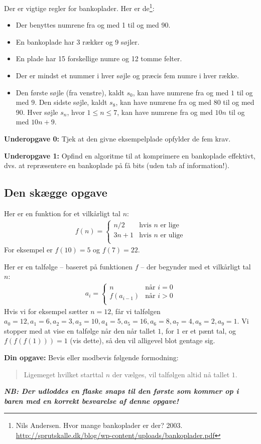 Der er vigtige regler for bankoplader.  Her er de\footnote{Nils Andersen.  Hvor
mange bankoplader er der?  2003.\\
\tiny{\url{http://sprutskalle.dk/blog/wp-content/uploads/bankoplader.pdf}}}:

\begin{itemize}
\item Der benyttes numrene fra og med 1 til og med 90.
\item En bankoplade har 3 rækker og 9 søjler.
\item En plade har 15 forskellige numre og 12 tomme felter.
\item Der er mindst et nummer i hver søjle og præcis fem numre i hver række.
\item Den første søjle (fra venstre), kaldt $s_0$, kan have numrene fra og med
$1$ til og med $9$.  Den sidste søjle, kaldt $s_8$, kan have numrene fra og med
$80$ til og med $90$.  Hver søjle $s_n$, hvor $1 \leq n \leq 7$, kan have
numrene fra og med $10n$ til og med $10n + 9$.
\end{itemize}

\textbf{Underopgave 0:} Tjek at den givne eksempelplade opfylder de fem krav.

\textbf{Underopgave 1:} Opfind en algoritme til at komprimere en bankoplade
effektivt, dvs. at repræsentere en bankoplade på få bits (uden tab af
information!).


\newpage

\subsection{Den skægge opgave}


Her er en funktion for et vilkårligt tal $n$:
\begin{align*}
f(n) = \begin{cases}
n/2 &\text{hvis }n\text{ er lige}\\
3n + 1 &\text{hvis }n\text{ er ulige}\\
\end{cases}
\end{align*}
For eksempel er $f(10) = 5$ og $f(7) = 22$.

Her er en talfølge -- baseret på funktionen $f$ -- der begynder med et
vilkårligt tal $n$:
\begin{align*}
a_i = \begin{cases}
n &\text{når }i = 0\\
f(a_{i - 1}) &\text{når }i > 0\\
\end{cases}
\end{align*}
Hvis vi for eksempel sætter $n = 12$, får vi talfølgen
$a_0 = 12, a_1 = 6, a_2 = 3, a_3 = 10, a_4 = 5, a_5 = 16, a_6 = 8, a_7 = 4, a_8
= 2, a_9 = 1$.  Vi stopper med at vise en talfølge når den når tallet $1$, for
$1$ er et pænt tal, og $f(f(f(1))) = 1$ (vis dette), så den vil alligevel blot
gentage sig.

\textbf{Din opgave:} Bevis eller modbevis følgende formodning:
\begin{quote}
Ligemeget hvilket starttal $n$ der vælges, vil talfølgen altid nå tallet $1$.
\end{quote}

\textbf{\emph{NB: Der udloddes en flaske snaps til den første som kommer op i
baren med en korrekt besvarelse af denne opgave!}}
